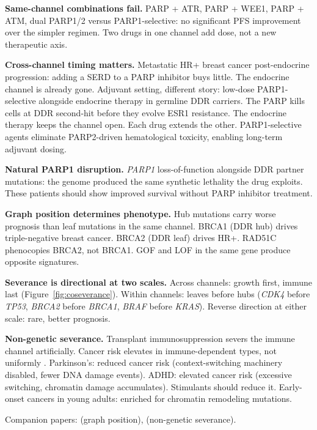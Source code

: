 \documentclass[11pt]{article}
\begin{document}
\textbf{Same-channel combinations fail.} PARP + ATR, PARP + WEE1,
PARP + ATM, dual PARP1/2 versus PARP1-selective: no significant PFS
improvement over the simpler regimen. Two drugs in one channel add
dose, not a new therapeutic axis.

\textbf{Cross-channel timing matters.} Metastatic HR+ breast cancer
post-endocrine progression: adding a SERD to a PARP inhibitor buys
little. The endocrine channel is already gone. Adjuvant setting,
different story: low-dose PARP1-selective alongside endocrine therapy
in germline DDR carriers. The PARP kills cells at DDR second-hit
before they evolve ESR1 resistance. The endocrine therapy keeps the
channel open. Each drug extends the other. PARP1-selective agents
eliminate PARP2-driven hematological toxicity, enabling long-term
adjuvant dosing.

\textbf{Natural PARP1 disruption.} \emph{PARP1} loss-of-function
alongside DDR partner mutations: the genome produced the same
synthetic lethality the drug exploits. These patients should show
improved survival without PARP inhibitor treatment.

\textbf{Graph position determines phenotype.} Hub mutations carry
worse prognosis than leaf mutations in the same channel. BRCA1 (DDR
hub) drives triple-negative breast cancer. BRCA2 (DDR leaf) drives
HR+. RAD51C phenocopies BRCA2, not BRCA1. GOF and LOF in the same
gene produce opposite signatures.

\textbf{Severance is directional at two scales.} Across channels:
growth first, immune last (Figure~\ref{fig:coseverance}). Within
channels: leaves before hubs (\emph{CDK4} before \emph{TP53},
\emph{BRCA2} before \emph{BRCA1}, \emph{BRAF} before \emph{KRAS}).
Reverse direction at either scale: rare, better prognosis.

\textbf{Non-genetic severance.} Transplant immunosuppression severs
the immune channel artificially. Cancer risk elevates in
immune-dependent types, not uniformly \cite{Engels2011}.
Parkinson's: reduced cancer risk (context-switching machinery
disabled, fewer DNA damage events). ADHD: elevated cancer risk
(excessive switching, chromatin damage accumulates). Stimulants
should reduce it. Early-onset cancers in young adults: enriched for
chromatin remodeling mutations.

Companion papers: \cite{McCarthy2026f} (graph position),
\cite{McCarthy2026h} (non-genetic severance).

\end{document}
